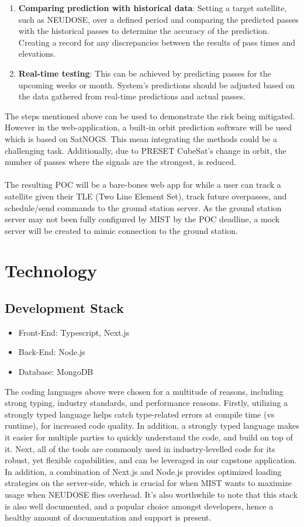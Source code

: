 \documentclass{article}
\begin{document}
\begin{enumerate}
    \item \textbf{Comparing prediction with historical data}: Setting a target satellite, such as NEUDOSE, over a defined period and comparing the predicted passes with the historical passes to determine the accuracy of the prediction. Creating a record for any discrepancies between the results of pass times and elevations.
    \item \textbf{Real-time testing}: This can be achieved by predicting passes for the upcoming weeks or month. System's predictions should be adjusted based on the data gathered from real-time predictions and actual passes. 
\end{enumerate}
The steps mentioned above can be used to demonstrate the risk being mitigated. However in the web-application, a built-in orbit prediction software will be used which is based on SatNOGS. This mean integrating the methods could be a challenging task. Additionally, due to PRESET CubeSat's change in orbit, the number of passes where the signals are the strongest, is reduced.
\\ \\
The resulting POC will be a bare-bones web app for while a user can track a satellite given their TLE (Two Line Element Set), track future overpasses, and schedule/send commands to the ground station server. As the ground station server may not been fully configured by MIST by the POC deadline, a mock server will be created to mimic connection to the ground station. 

\section{Technology}

\subsection{Development Stack}
\begin{itemize}
\item Front-End: Typescript, Next.js
\item Back-End: Node.js
\item Database: MongoDB
\end{itemize}
The coding languages above were chosen for a multitude of reasons, including strong typing, industry standards, and performance reasons. Firstly, utilizing a strongly typed language helps catch type-related errors at compile time (vs runtime), for increased code quality. In addition, a strongly typed language makes it easier for multiple parties to quickly understand the code, and build on top of it. Next, all of the tools are commonly used in industry-levelled code for its robust, yet flexible capabilities, and can be leveraged in our capstone application. In addition, a combination of Next.js and Node.js provides optimized loading strategies on the server-side, which is crucial for when MIST wants to maximize usage when NEUDOSE flies overhead. It’s also worthwhile to note that this stack is also well documented, and a popular choice amongst developers, hence a healthy amount of documentation and support is present.
\end{document}
